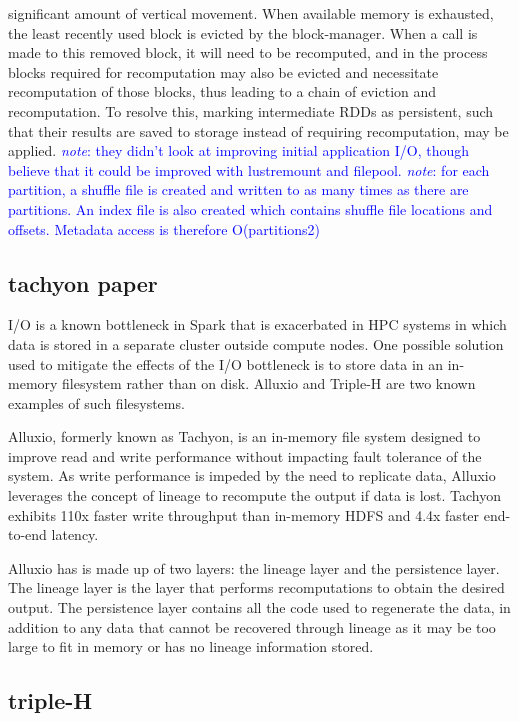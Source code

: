 \documentclass{report}
\newcommand{\note}[1]{\textcolor{blue}{\textit{note}: #1}}
\begin{document}
    significant amount of vertical movement. When available memory is exhausted,
    the least recently used block is evicted by the block-manager. When a call
    is made to this removed block, it will need to be recomputed, and in the
    process blocks required for recomputation may also be evicted and
    necessitate recomputation of those blocks, thus leading to a chain of
    eviction and recomputation. To resolve this, marking intermediate RDDs as
    persistent, such that their results are saved to storage instead of
    requiring recomputation, may be applied.  \note{they didn't look at
    improving initial application I/O, though believe that it could be improved
    with lustremount and filepool. } \note{for each partition, a shuffle file is
    created and written to as many times as there are partitions. An index file
    is also created which contains shuffle file locations and offsets. Metadata
    access is therefore O(partitions2)}
	
    \subsection{tachyon paper} I/O is a known bottleneck in Spark that is
    exacerbated in HPC systems in which data is stored in a separate cluster
    outside compute nodes. One possible solution used to mitigate the effects of
    the I/O bottleneck is to store data in an in-memory filesystem rather than
    on disk.  Alluxio and Triple-H are two known examples of such filesystems.
	
    Alluxio, formerly known as Tachyon, is an in-memory file system designed to
    improve read and write performance without impacting fault tolerance of the
    system. As write performance is impeded by the need to replicate data,
    Alluxio leverages the concept of lineage to recompute the output if data is
    lost.  Tachyon exhibits 110x faster write throughput than in-memory HDFS and
    4.4x faster end-to-end latency. 

    Alluxio has is made up of two layers: the lineage layer and the persistence
    layer. The lineage layer is the layer that performs recomputations to obtain
    the desired output. The persistence layer contains all the code used to
    regenerate the data, in addition to any data that cannot be recovered
    through lineage as it may be too large to fit in memory or has no lineage
    information stored.
	
    \subsection{triple-H}
	
\end{document}

